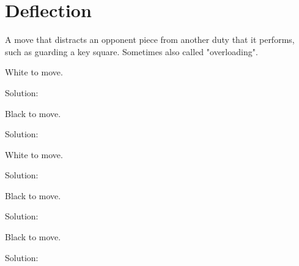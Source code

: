 \documentclass{book}
\begin{document}
\section{Deflection}
A move that distracts an opponent piece from another duty that it performs, such as guarding a key square. Sometimes also called "overloading".\begin{multicols}{2} 
\begin{samepage} 
\newgame 


 
\showboard
 
 White to move. 
 
Solution: 
 
\end{samepage}\begin{samepage} 
\newgame 


 
\showboard
 
 Black to move. 
 
Solution: 
 
\end{samepage}\begin{samepage} 
\newgame 


 
\showboard
 
 White to move. 
 
Solution: 
 
\end{samepage}\begin{samepage} 
\newgame 


 
\showboard
 
 Black to move. 
 
Solution: 
 
\end{samepage}\begin{samepage} 
\newgame 


 
\showboard
 
 Black to move. 
 
Solution: 
 
\end{samepage}\end{multicols} 
\newpage 
\end{document}
